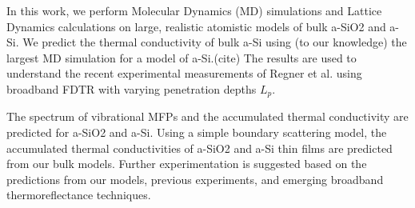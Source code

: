 \documentclass[aps,prb,onecolumn,preprint,superscriptaddress,footinbib,amsmath,amssymb,floatfix]{revtex4}
\begin{document}
In this work, we perform Molecular Dynamics (MD) simulations and 
Lattice Dynamics calculations on large, realistic atomistic models 
of bulk a-SiO2 and a-Si. 
We predict the thermal conductivity of bulk a-Si using (to our 
knowledge) the largest MD simulation for a model of a-Si.(cite) 
The results are used to 
understand the recent experimental measurements of Regner et al. 
using broadband FDTR with varying 
penetration depths $L_p$.\cite{regner_broadband_2013}

The spectrum of vibrational MFPs and the accumulated thermal conductivity 
are predicted for a-SiO2 and a-Si. 
Using a simple boundary scattering model, the accumulated thermal 
conductivities of a-SiO2 and a-Si thin films are predicted 
from our bulk models. Further experimentation 
is suggested based on the predictions from our models, previous 
experiments,
\cite{freeman_thermal_1986,cahill_lattice_1988,cahill_thermal_1989,
love_estimate_1990,cahill_thermal_1994,lee_heat_1997,
yamane_measurement_2002,baldi_thermal_2008,
liu_high_2009,yang_anomalously_2010}
and emerging broadband thermoreflectance techniques.
\cite{koh_frequency_2007,minnich_thermal_2011,regner_broadband_2013,
yang_mean_2013}
\end{document}
